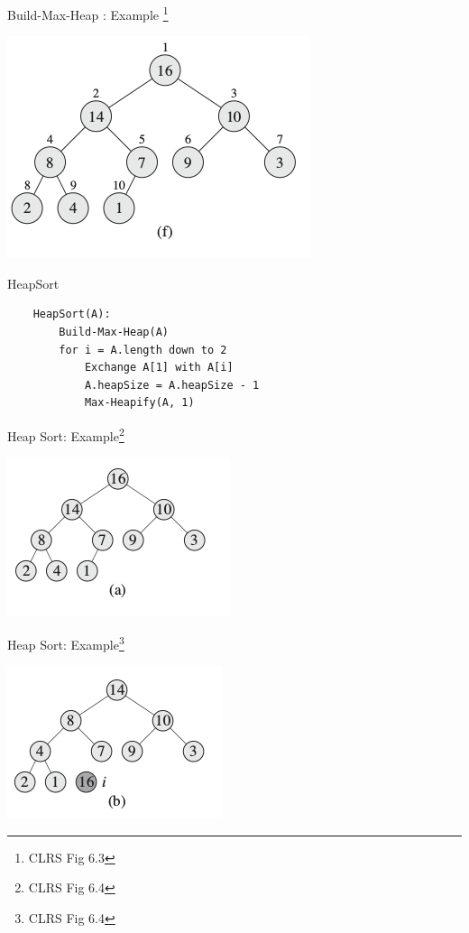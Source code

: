 \documentclass{beamer}
\begin{document}
\begin{frame}{Build-Max-Heap : Example \footnote{CLRS Fig 6.3}}
    \begin{center}
        \includegraphics[scale=0.5]{buildMaxHeap6.png}
    \end{center}
\end{frame}


\begin{frame}[fragile]{HeapSort}
    \begin{verbatim}
    HeapSort(A):
        Build-Max-Heap(A)
        for i = A.length down to 2
            Exchange A[1] with A[i]
            A.heapSize = A.heapSize - 1
            Max-Heapify(A, 1)
    \end{verbatim}
\end{frame}


\begin{frame}{Heap Sort: Example\footnote{CLRS Fig 6.4}}
    \begin{center}
        \includegraphics[scale=0.5]{heapSort1.png}
    \end{center}
\end{frame}


\begin{frame}{Heap Sort: Example\footnote{CLRS Fig 6.4}}
    \begin{center}
        \includegraphics[scale=0.5]{heapSort2.png}
    \end{center}
\end{frame}
\end{document}
